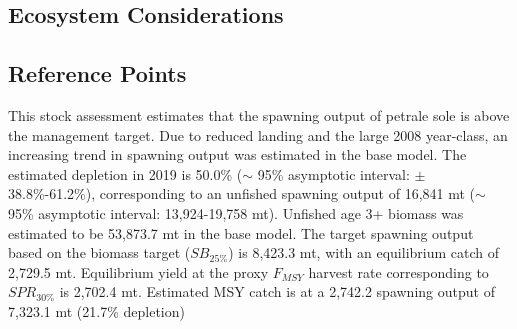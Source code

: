 \documentclass[12pt,]{article}
\begin{document}
\FloatBarrier

\subsection*{Ecosystem Considerations}\label{ecosystem-considerations}

\subsection*{Reference Points}\label{reference-points}

This stock assessment estimates that the spawning output of petrale sole
is above the management target. Due to reduced landing and the large
2008 year-class, an increasing trend in spawning output was estimated in
the base model. The estimated depletion in 2019 is 50.0\% (\(\sim\) 95\%
asymptotic interval: \(\pm\) 38.8\%-61.2\%), corresponding to an
unfished spawning output of 16,841 mt (\(\sim\) 95\% asymptotic
interval: 13,924-19,758 mt). Unfished age 3+ biomass was estimated to be
53,873.7 mt in the base model. The target spawning output based on the
biomass target (\(SB_{25\%}\)) is 8,423.3 mt, with an equilibrium catch
of 2,729.5 mt. Equilibrium yield at the proxy \(F_{MSY}\) harvest rate
corresponding to \(SPR_{30\%}\) is 2,702.4 mt. Estimated MSY catch is at
a 2,742.2 spawning output of 7,323.1 mt (21.7\% depletion)
\end{document}
